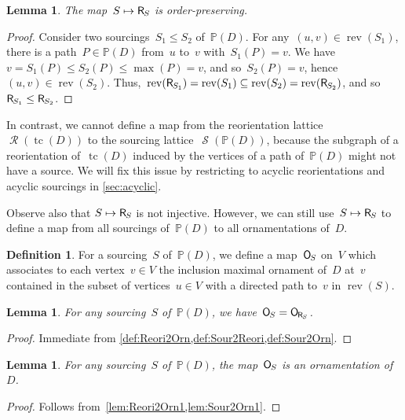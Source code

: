 \documentclass{amsart}
\newtheorem{lemma}[theorem]{Lemma}
\theoremstyle{definition}
\newtheorem{definition}[theorem]{Definition}
\renewcommand{\c}[1]{\mathcal{#1}} %
\DeclareMathOperator{\tc}{tc} %
\newcommand{\mymap}[2]{\mathsf{#1}_{\hspace{-.7pt}#2}}
\newcommand{\orn}[1]{\mymap{O}{#1}}  %
\DeclareMathOperator{\Reori}{\c{R}}  %
\newcommand{\reori}[1]{\mymap{R}{#1}}  %
\DeclareMathOperator{\rev}{rev} %
\DeclareMathOperator{\Sour}{\mathcal{S}}  %
\newcommand{\PP}{\mathbb P} %
\begin{document}
\begin{lemma}
\label{lem:Sour2Reori}
The map~$S \mapsto \reori{S}$ is order-preserving.
\end{lemma}

\begin{proof}
Consider two sourcings~$S_1 \le S_2$ of~$\PP(D)$.
For any~$(u,v) \in \rev(S_1)$, there is a path~$P \in \PP(D)$ from~$u$ to~$v$ with~$S_1(P) = v$.
We have~$v = S_1(P) \le S_2(P) \le \max(P) = v$, and so~$S_2(P) = v$, hence~$(u,v) \in \rev(S_2)$.
Thus,~$\rev(\reori{S_1}) = \rev(S_1) \subseteq \rev(S_2) = \rev(\reori{S_2})$, and so~${\reori{S_1} \le \reori{S_2}}$.
\end{proof}

In contrast, we cannot define a map from the reorientation lattice~$\Reori(\tc(D))$ to the sourcing lattice~$\Sour(\PP(D))$, because the subgraph of a reorientation of~$\tc(D)$ induced by the vertices of a path of~$\PP(D)$ might not have a source.
We will fix this issue by restricting to acyclic reorientations and acyclic sourcings in \cref{sec:acyclic}.

Observe also that $S \mapsto \reori{S}$ is not injective.
However, we can still use~$S \mapsto \reori{S}$ to define a map from all sourcings of~$\PP(D)$ to all ornamentations of~$D$.

\begin{definition}
\label{def:Sour2Orn}
For a sourcing~$S$ of~$\PP(D)$, we define a map~$\orn{S}$ on~$V$ which associates to each vertex~$v \in V$ the inclusion maximal ornament of~$D$ at~$v$ contained in the subset of vertices~$u \in V$ with a directed path to~$v$ in $\rev(S)$.
\end{definition}

\begin{lemma}
\label{lem:Sour2Orn1}
For any sourcing~$S$ of~$\PP(D)$, we have~$\orn{S} = \orn{\reori{S}}$.
\end{lemma}

\begin{proof}
Immediate from \cref{def:Reori2Orn,def:Sour2Reori,def:Sour2Orn}.
\end{proof}

\begin{lemma}
\label{lem:Sour2Orn2}
For any sourcing~$S$ of~$\PP(D)$, the map~$\orn{S}$ is an ornamentation of~$D$.
\end{lemma}

\begin{proof}
Follows from~\cref{lem:Reori2Orn1,lem:Sour2Orn1}.
\end{proof}
\end{document}
